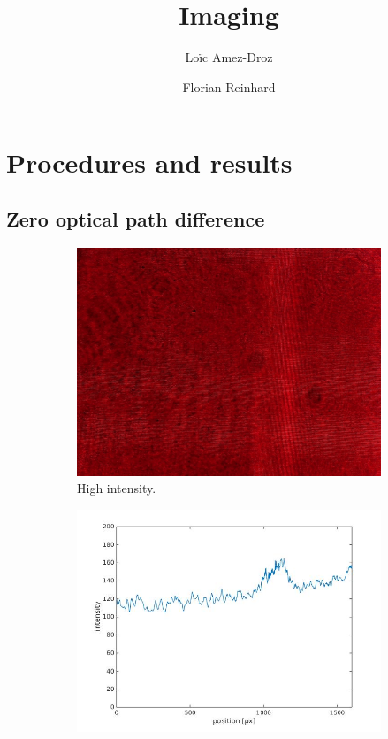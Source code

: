 \documentclass[a4paper, 12pt]{paper}
\author{Loïc Amez-Droz \and Florian Reinhard}
\title{Imaging}
\begin{document}

\section{Procedures and results}
\subsection{Zero optical path difference}

\begin{figure}[H]
    \begin{subfigure}[t]{0.45\textwidth}
        \includegraphics[width=\textwidth]{img/ZOPD_high}
        \caption{High intensity.}
    \end{subfigure}
    \begin{subfigure}[t]{0.45\textwidth}
        \includegraphics[width=\textwidth]{img/ZOPD_high_line}

\end{subfigure}
\end{figure}
\end{document}
